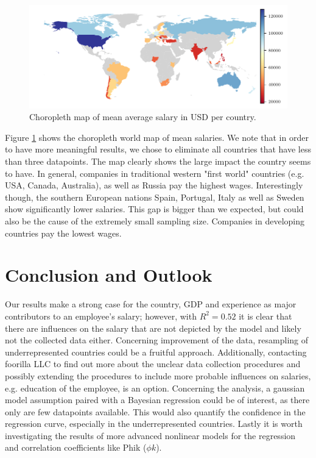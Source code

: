 \documentclass{article}
\begin{document}
\begin{figure}[ht]
    \hspace*{-.85cm}
    \centering
    \includegraphics{choropleth.pdf}
    \caption{Choropleth map of mean average salary in USD per country.}
    \label{fig:choropleth}
\end{figure}

Figure \ref{fig:choropleth} shows the choropleth world map of mean salaries. We note that in order to have more meaningful results, we chose to eliminate all countries that have less than three datapoints. The map clearly shows the large impact the country seems to have. In general, companies in traditional western "first world" countries (e.g. USA, Canada, Australia), as well as Russia pay the highest wages. Interestingly though, the southern European nations Spain, Portugal, Italy as well as Sweden show significantly lower salaries. This gap is bigger than we expected, but could also be the cause of the extremely small sampling size. Companies in developing countries pay the lowest wages.


\section{Conclusion and Outlook}
Our results make a strong case for the country, GDP and experience as major contributors to an employee's salary; however, with $R^2=0.52$ it is clear that there are influences on the salary that are not depicted by the model and likely not the collected data either. Concerning improvement of the data, resampling of underrepresented countries could be a fruitful approach. Additionally, contacting foorilla LLC to find out more about the unclear data collection procedures and possibly extending the procedures to include more probable influences on salaries, e.g. education of the employee, is an option. Concerning the analysis, a gaussian model assumption paired with a Bayesian regression could be of interest, as there only are few datapoints available. This would also quantify the confidence in the regression curve, especially in the underrepresented countries. Lastly it is worth investigating the results of more advanced nonlinear models for the regression and correlation coefficients like Phik ($\phi k$).



\end{document}
